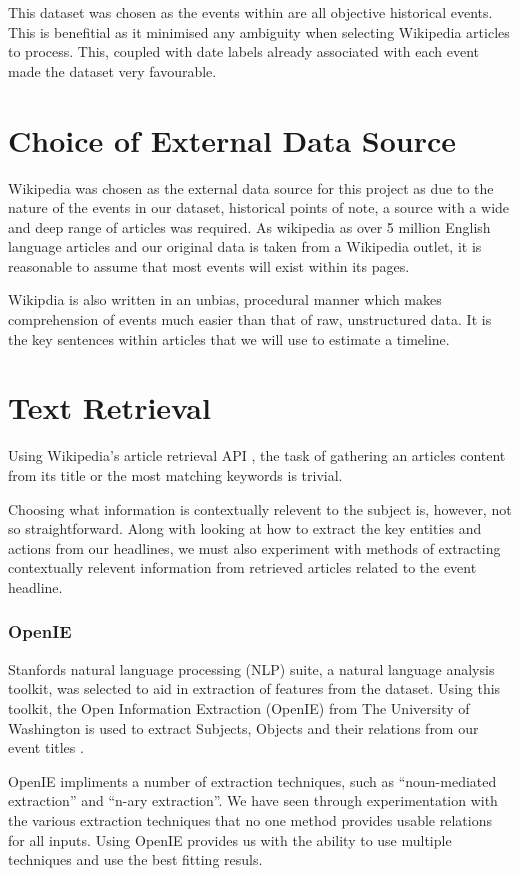 \documentclass[bsc,frontabs,twoside,singlespacing,parskip,deptreport]{infthesis}     %
\begin{document}
This dataset was chosen as the events within are all objective historical events. This is benefitial as it minimised
any ambiguity when selecting Wikipedia articles to process. This, coupled with date labels already associated with
each event made the dataset very favourable.


\section{Choice of External Data Source}
Wikipedia was chosen as the external data source for this project as
due to the nature of the events in our dataset, historical points of note,
a source with a wide and deep range of articles was required.
As wikipedia as over 5 million English language articles \cite{wikipedaisize} and our original data
is taken from a Wikipedia outlet, it is reasonable to assume
that most events will exist within its pages.


Wikipdia is also written in an unbias, procedural manner which makes comprehension of events much
easier than that of raw, unstructured data.
It is the key sentences within articles that we will use to estimate a timeline.

\section{Text Retrieval}
Using Wikipedia's article retrieval API \cite{wikipediaAPI}, the task of gathering an articles content
from its title or the most matching keywords is trivial.

Choosing what information is contextually relevent to the subject is, however, not so straightforward.
Along with looking at how to extract the key entities and actions from our 
headlines, we must also experiment with methods of extracting contextually relevent information from
retrieved articles related to the event headline.

\subsubsection{OpenIE}
Stanfords natural language processing (NLP) suite,
a natural language analysis toolkit,
was selected to aid in extraction of features from the dataset.
Using this toolkit, the Open Information Extraction (OpenIE) from
The University of Washington is used to extract Subjects, Objects
and their relations from our event titles \cite{schmitz2012open}.


OpenIE impliments a number of extraction techniques, such as ``noun-mediated extraction'' and ``n-ary extraction''.
We have seen through experimentation with the various extraction techniques that no one method provides
usable relations for all inputs. Using OpenIE provides us with the ability to use multiple techniques and
use the best fitting resuls.
\end{document}
